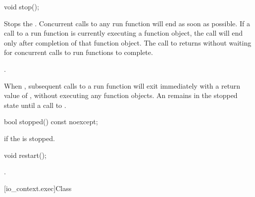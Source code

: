 %
\begin{itemdecl}
void stop();
\end{itemdecl}

\begin{itemdescr}
\pnum
\effects Stops the . Concurrent calls to any run function will end as soon as possible. If a call to a run function is currently executing a function object, the call will end only after completion of that function object. The call to  returns without waiting for concurrent calls to run functions to complete.

\pnum
\postconditions {}.

\pnum
\begin{note} When , subsequent calls to a run function will exit immediately with a return value of , without executing any function objects. An  remains in the stopped state until a call to . \end{note}
\end{itemdescr}

%
\begin{itemdecl}
bool stopped() const noexcept;
\end{itemdecl}

\begin{itemdescr}
\pnum
\returns {} if the  is stopped.
\end{itemdescr}

%
\begin{itemdecl}
void restart();
\end{itemdecl}

\begin{itemdescr}
\pnum
\postconditions {}.
\end{itemdescr}




[io_context.exec]{Class }

